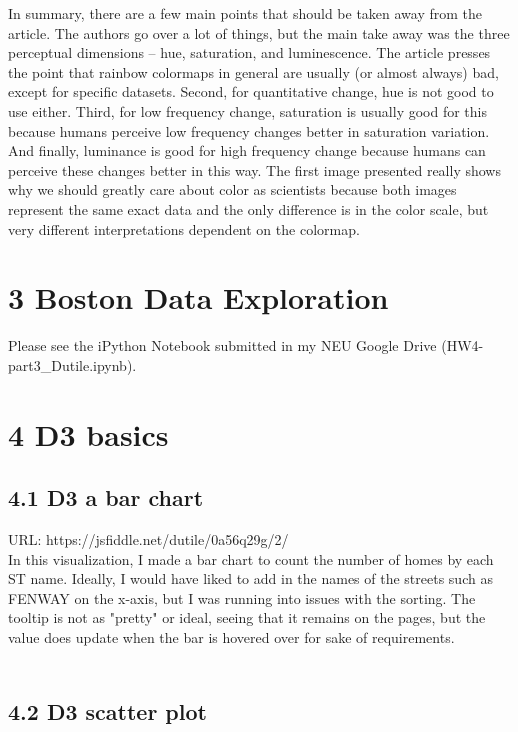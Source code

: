 \documentclass{neu_handout}
\begin{document}
In summary, there are a few main points that should be taken away from the article. The authors go over a lot of things, but the main take away was the three perceptual dimensions – hue, saturation, and luminescence. The article presses the point that rainbow colormaps in general are usually (or almost always) bad, except for specific datasets. Second, for quantitative change, hue is not good to use either. Third, for low frequency change, saturation is usually good for this because humans perceive low frequency changes better in saturation variation. And finally, luminance is good for high frequency change because humans can perceive these changes better in this way. The first image presented really shows why we should greatly care about color as scientists because both images represent the same exact data and the only difference is in the color scale, but very different interpretations dependent on the colormap.

\section*{3 Boston Data Exploration}

Please see the iPython Notebook submitted in my NEU Google Drive (HW4-part3\_Dutile.ipynb).

\section*{4 D3 basics}

\subsection*{4.1 D3 a bar chart}

URL: https://jsfiddle.net/dutile/0a56q29g/2/ \\

In this visualization, I made a bar chart to count the number of homes by each ST name. Ideally, I would have liked to add in the names of the streets such as FENWAY on the x-axis, but I was running into issues with the sorting. The tooltip is not as "pretty" or ideal, seeing that it remains on the pages, but the value does update when the bar is hovered over for sake of requirements. \\\\

\subsection*{4.2 D3 scatter plot}
\end{document}
